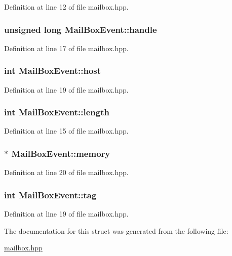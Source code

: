 Definition at line 12 of file mailbox.hpp.\hypertarget{struct_mail_box_event_a514bc3bba3344150482f1d9242ab4a69}{
\subsubsection[{handle}]{\setlength{\rightskip}{0pt plus 5cm}unsigned long {\bf MailBoxEvent::handle}}}
\label{struct_mail_box_event_a514bc3bba3344150482f1d9242ab4a69}


Definition at line 17 of file mailbox.hpp.\hypertarget{struct_mail_box_event_aa36d737e6dcc60e6c6ffc7741ec65331}{
\subsubsection[{host}]{\setlength{\rightskip}{0pt plus 5cm}int {\bf MailBoxEvent::host}}}
\label{struct_mail_box_event_aa36d737e6dcc60e6c6ffc7741ec65331}


Definition at line 19 of file mailbox.hpp.\hypertarget{struct_mail_box_event_a70601308260beb76601c24e5cf49c866}{
\subsubsection[{length}]{\setlength{\rightskip}{0pt plus 5cm}int {\bf MailBoxEvent::length}}}
\label{struct_mail_box_event_a70601308260beb76601c24e5cf49c866}


Definition at line 15 of file mailbox.hpp.\hypertarget{struct_mail_box_event_a7c43c5a6b7311a0d9a69964d28a07eb2}{
\subsubsection[{memory}]{$\ast$ {\bf MailBoxEvent::memory}}}
\label{struct_mail_box_event_a7c43c5a6b7311a0d9a69964d28a07eb2}


Definition at line 20 of file mailbox.hpp.\hypertarget{struct_mail_box_event_a2f5ed3c05ac0ca2ef5fc4ec7e3128390}{
\subsubsection[{tag}]{\setlength{\rightskip}{0pt plus 5cm}int {\bf MailBoxEvent::tag}}}
\label{struct_mail_box_event_a2f5ed3c05ac0ca2ef5fc4ec7e3128390}


Definition at line 19 of file mailbox.hpp.

The documentation for this struct was generated from the following file:\begin{DoxyCompactItemize}
\item 
\hyperlink{mailbox_8hpp}{mailbox.hpp}\end{DoxyCompactItemize}
